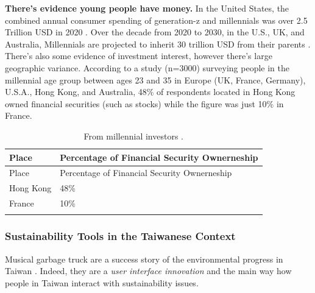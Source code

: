 \documentclass[
  letterpaper,
  DIV=11,
  numbers=noendperiod]{scrartcl}
\begin{document}
\textbf{There's evidence young people have money.} In the United States,
the combined annual consumer spending of generation-z and millennials
was over 2.5 Trillion USD in 2020 \citep{ypulseMillennialsGenTeens2020}.
Over the decade from 2020 to 2030, in the U.S., UK, and Australia,
Millennials are projected to inherit 30 trillion USD from their parents
\citep{calastoneMillennialsInvestingDetailed2020}. There's also some
evidence of investment interest, however there's large geographic
variance. According to a
\citep{calastoneMillennialsInvestingDetailed2020} study (n=3000)
surveying people in the millennial age group between ages 23 and 35 in
Europe (UK, France, Germany), U.S.A., Hong Kong, and Australia, 48\% of
respondents located in Hong Kong owned financial securities (such as
stocks) while the figure was just 10\% in France.

\begin{longtable}[]{@{}ll@{}}
\caption{From millennial investors
\citep{calastoneMillennialsInvestingDetailed2020}.}\tabularnewline
\toprule\noalign{}
Place & Percentage of Financial Security Ownerneship \\
\midrule\noalign{}
\endfirsthead
\toprule\noalign{}
Place & Percentage of Financial Security Ownerneship \\
\midrule\noalign{}
\endhead
\bottomrule\noalign{}
\endlastfoot
Hong Kong & 48\% \\
France & 10\% \\
& \\
\end{longtable}

\subsubsection{Sustainability Tools in the Taiwanese
Context}\label{sustainability-tools-in-the-taiwanese-context}

Musical garbage truck are a success story of the environmental progress
in Taiwan \citep{helendavidsonClassicalTrashHow2022}. Indeed, they are a
\emph{user interface innovation} and the main way how people in Taiwan
interact with sustainability issues.
\end{document}
